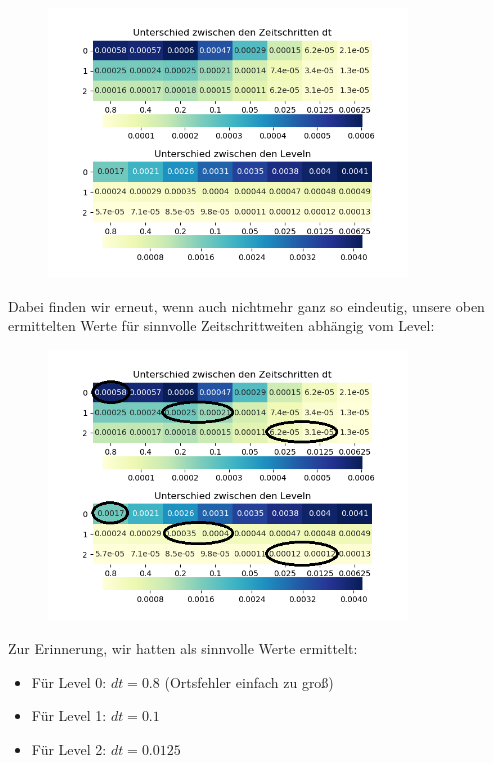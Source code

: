 \begin{figure}[H]
	\centering
	\includegraphics[width=0.85\textwidth]{../Aufgabe31/Maxdiff/Heatmapblubintegral.png}
\end{figure}
Dabei finden wir erneut, wenn auch nichtmehr ganz so eindeutig, unsere oben ermittelten Werte für sinnvolle Zeitschrittweiten abhängig vom Level:
\begin{figure}[H]
	\centering
	\includegraphics[width=0.85\textwidth]{../Aufgabe31/Maxdiff/Heatmapblubintegral1.png}
\end{figure}
Zur Erinnerung, wir hatten als sinnvolle Werte ermittelt:
\begin{itemize}
	\item Für Level 0: \qquad $dt = 0.8$ (Ortsfehler einfach zu groß)
	\item Für Level 1: \qquad $dt = 0.1$ 
	\item Für Level 2: \qquad $dt = 0.0125$
\end{itemize}
 




